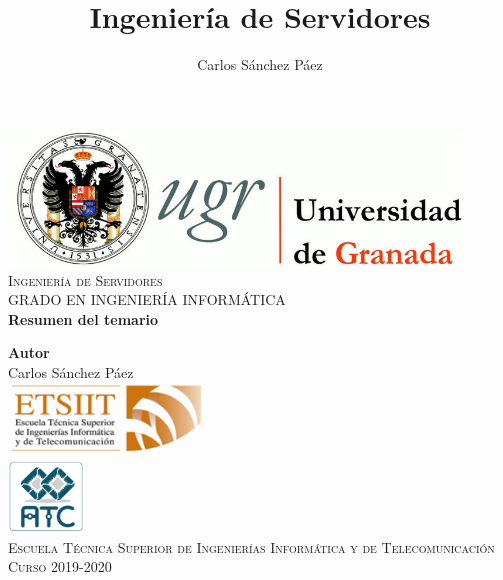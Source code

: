 \documentclass[12pt,spanish]{article}
\title{Ingeniería de Servidores}
\author{Carlos Sánchez Páez}
\begin{document}
\lstset{columns=fullflexible,basicstyle=\ttfamily}


\begin{titlepage}

 \newlength{\centeroffset}
 \setlength{\centeroffset}{-0.5\oddsidemargin}
 \addtolength{\centeroffset}{0.5\evensidemargin}
 \thispagestyle{empty}

 \noindent\hspace*{\centeroffset}
 \begin{minipage}{\textwidth}

  \centering
  \includegraphics[width=0.9\textwidth]{logo_ugr.jpg}\\[1.4cm]

  \textsc{ \Large Ingeniería de Servidores\\[0.2cm]}
  \textsc{GRADO EN INGENIERÍA INFORMÁTICA}\\[1cm]

  {\Huge\bfseries Resumen del temario\\}
 \end{minipage}

 \vspace{1.5cm}
 \noindent\hspace*{\centeroffset}
 \begin{minipage}{\textwidth}
  \centering

  \textbf{Autor}\\ {Carlos Sánchez Páez}\\[2.5ex]
  \includegraphics[width=0.4\textwidth]{etsiit_logo.png}\\[0.1cm]
  \vspace{1.5cm}
  \includegraphics[width=0.15\textwidth]{atc.jpg}\\[0.1cm]
  \vspace{1cm}
  \textsc{Escuela Técnica Superior de Ingenierías Informática y de Telecomunicación}\\
  \vspace{1cm}
  \textsc{Curso 2019-2020}
 \end{minipage}
\end{titlepage}
\thispagestyle{empty}
\newpage
\tableofcontents{}
\newpage
\listoffigures
\thispagestyle{empty}
\newpage
\end{document}
